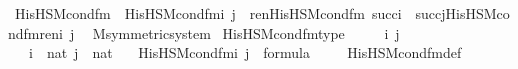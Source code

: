 \begin{isabellebody}
\isamarkupfalse%
\ His{\isacharunderscore}{\kern0pt}HS{\isacharunderscore}{\kern0pt}M{\isacharunderscore}{\kern0pt}cond{\isacharunderscore}{\kern0pt}fm{\isacharprime}{\kern0pt}\ \ {\isachardoublequoteopen}His{\isacharunderscore}{\kern0pt}HS{\isacharunderscore}{\kern0pt}M{\isacharunderscore}{\kern0pt}cond{\isacharunderscore}{\kern0pt}fm{\isacharprime}{\kern0pt}{\isacharparenleft}{\kern0pt}i{\isacharcomma}{\kern0pt}\ j{\isacharparenright}{\kern0pt}\ {\isasymequiv}\ ren{\isacharparenleft}{\kern0pt}His{\isacharunderscore}{\kern0pt}HS{\isacharunderscore}{\kern0pt}M{\isacharunderscore}{\kern0pt}cond{\isacharunderscore}{\kern0pt}fm{\isacharparenleft}{\kern0pt}{}{\isacharcomma}{\kern0pt}\ {}{\isacharparenright}{\kern0pt}{\isacharparenright}{\kern0pt}{\isacharbackquote}{\kern0pt}{}{\isacharbackquote}{\kern0pt}{\isacharparenleft}{\kern0pt}succ{\isacharparenleft}{\kern0pt}i{\isacharparenright}{\kern0pt}\ {\isasymunion}\ succ{\isacharparenleft}{\kern0pt}j{\isacharparenright}{\kern0pt}{\isacharparenright}{\kern0pt}{\isacharbackquote}{\kern0pt}His{\isacharunderscore}{\kern0pt}HS{\isacharunderscore}{\kern0pt}M{\isacharunderscore}{\kern0pt}cond{\isacharunderscore}{\kern0pt}fm{\isacharunderscore}{\kern0pt}ren{\isacharparenleft}{\kern0pt}i{\isacharcomma}{\kern0pt}\ j{\isacharparenright}{\kern0pt}{\isachardoublequoteclose}\ \isanewline
\isanewline
{}\isamarkupfalse%
\ M{\isacharunderscore}{\kern0pt}symmetric{\isacharunderscore}{\kern0pt}system\isanewline
{}\isanewline
\isanewline
{}\isamarkupfalse%
\ His{\isacharunderscore}{\kern0pt}HS{\isacharunderscore}{\kern0pt}M{\isacharunderscore}{\kern0pt}cond{\isacharunderscore}{\kern0pt}fm{\isacharprime}{\kern0pt}{\isacharunderscore}{\kern0pt}type\ {\isacharcolon}{\kern0pt}\ \isanewline
\ \ \ i\ j\ \isanewline
\ \ \ {\isachardoublequoteopen}i\ {\isasymin}\ nat{\isachardoublequoteclose}\ {\isachardoublequoteopen}j\ {\isasymin}\ nat{\isachardoublequoteclose}\isanewline
\ \ \ {\isachardoublequoteopen}His{\isacharunderscore}{\kern0pt}HS{\isacharunderscore}{\kern0pt}M{\isacharunderscore}{\kern0pt}cond{\isacharunderscore}{\kern0pt}fm{\isacharprime}{\kern0pt}{\isacharparenleft}{\kern0pt}i{\isacharcomma}{\kern0pt}\ j{\isacharparenright}{\kern0pt}\ {\isasymin}\ formula{\isachardoublequoteclose}\ \isanewline
%
\isadelimproof
\ \ %
\endisadelimproof
%
\isatagproof
{}\isamarkupfalse%
\ His{\isacharunderscore}{\kern0pt}HS{\isacharunderscore}{\kern0pt}M{\isacharunderscore}{\kern0pt}cond{\isacharunderscore}{\kern0pt}fm{\isacharprime}{\kern0pt}{\isacharunderscore}{\kern0pt}def\ \isanewline

\end{isabellebody}
